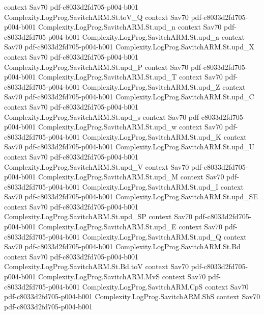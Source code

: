 \begin{theorem}
  {context}
  {Sav70}
  {pdf-c8033d2fd705-p004-b001}
\proofstep
  {Complexity.LogProg.SavitchARM.St.toV_Q}
  {context}
  {Sav70}
  {pdf-c8033d2fd705-p004-b001}
\proofstep
  {Complexity.LogProg.SavitchARM.St.upd_n}
  {context}
  {Sav70}
  {pdf-c8033d2fd705-p004-b001}
\proofstep
  {Complexity.LogProg.SavitchARM.St.upd_a}
  {context}
  {Sav70}
  {pdf-c8033d2fd705-p004-b001}
\proofstep
  {Complexity.LogProg.SavitchARM.St.upd_X}
  {context}
  {Sav70}
  {pdf-c8033d2fd705-p004-b001}
\proofstep
  {Complexity.LogProg.SavitchARM.St.upd_P}
  {context}
  {Sav70}
  {pdf-c8033d2fd705-p004-b001}
\proofstep
  {Complexity.LogProg.SavitchARM.St.upd_T}
  {context}
  {Sav70}
  {pdf-c8033d2fd705-p004-b001}
\proofstep
  {Complexity.LogProg.SavitchARM.St.upd_Z}
  {context}
  {Sav70}
  {pdf-c8033d2fd705-p004-b001}
\proofstep
  {Complexity.LogProg.SavitchARM.St.upd_C}
  {context}
  {Sav70}
  {pdf-c8033d2fd705-p004-b001}
\proofstep
  {Complexity.LogProg.SavitchARM.St.upd_s}
  {context}
  {Sav70}
  {pdf-c8033d2fd705-p004-b001}
\proofstep
  {Complexity.LogProg.SavitchARM.St.upd_w}
  {context}
  {Sav70}
  {pdf-c8033d2fd705-p004-b001}
\proofstep
  {Complexity.LogProg.SavitchARM.St.upd_K}
  {context}
  {Sav70}
  {pdf-c8033d2fd705-p004-b001}
\proofstep
  {Complexity.LogProg.SavitchARM.St.upd_U}
  {context}
  {Sav70}
  {pdf-c8033d2fd705-p004-b001}
\proofstep
  {Complexity.LogProg.SavitchARM.St.upd_V}
  {context}
  {Sav70}
  {pdf-c8033d2fd705-p004-b001}
\proofstep
  {Complexity.LogProg.SavitchARM.St.upd_M}
  {context}
  {Sav70}
  {pdf-c8033d2fd705-p004-b001}
\proofstep
  {Complexity.LogProg.SavitchARM.St.upd_I}
  {context}
  {Sav70}
  {pdf-c8033d2fd705-p004-b001}
\proofstep
  {Complexity.LogProg.SavitchARM.St.upd_SE}
  {context}
  {Sav70}
  {pdf-c8033d2fd705-p004-b001}
\proofstep
  {Complexity.LogProg.SavitchARM.St.upd_SP}
  {context}
  {Sav70}
  {pdf-c8033d2fd705-p004-b001}
\proofstep
  {Complexity.LogProg.SavitchARM.St.upd_E}
  {context}
  {Sav70}
  {pdf-c8033d2fd705-p004-b001}
\proofstep
  {Complexity.LogProg.SavitchARM.St.upd_Q}
  {context}
  {Sav70}
  {pdf-c8033d2fd705-p004-b001}
\proofstep
  {Complexity.LogProg.SavitchARM.St.Bd}
  {context}
  {Sav70}
  {pdf-c8033d2fd705-p004-b001}
\proofstep
  {Complexity.LogProg.SavitchARM.St.Bd.toV}
  {context}
  {Sav70}
  {pdf-c8033d2fd705-p004-b001}
\proofstep
  {Complexity.LogProg.SavitchARM.MvS}
  {context}
  {Sav70}
  {pdf-c8033d2fd705-p004-b001}
\proofstep
  {Complexity.LogProg.SavitchARM.CpS}
  {context}
  {Sav70}
  {pdf-c8033d2fd705-p004-b001}
\proofstep
  {Complexity.LogProg.SavitchARM.ShS}
  {context}
  {Sav70}
  {pdf-c8033d2fd705-p004-b001}

\end{theorem}
